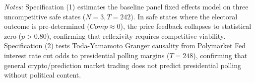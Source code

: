 \begin{table}[htbp]
\centering
\small
\caption{Placebo and Falsification Battery}
\label{tab:placebo}
\begin{minipage}{0.95\textwidth}
\vspace{1ex}
\footnotesize
\textit{Notes:} Specification (1) estimates the baseline panel fixed effects model on three uncompetitive safe states ($N=3, T=242$). In safe states where the electoral outcome is pre-determined ($Comp \approx 0$), the price feedback collapses to statistical zero ($p>0.80$), confirming that reflexivity requires competitive viability. Specification (2) tests Toda-Yamamoto Granger causality from Polymarket Fed interest rate cut odds to presidential polling margins ($T=248$), confirming that general crypto/prediction market trading does not predict presidential polling without political content.
\end{minipage}
\end{table}

